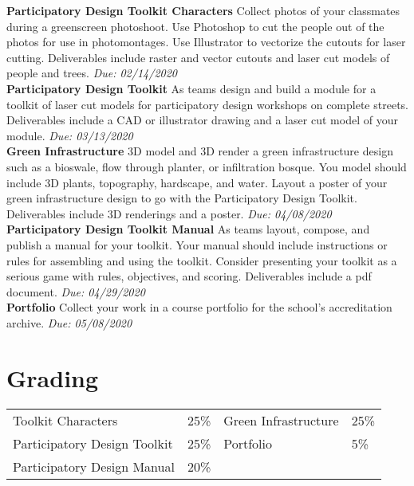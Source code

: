 \documentclass[11pt,article,oneside]{memoir}
\begin{document}
\noindent \textbf{Participatory Design Toolkit Characters}
Collect photos of your classmates
during a greenscreen photoshoot. 
Use Photoshop to cut the people out of the photos 
for use in photomontages.
Use Illustrator to vectorize the cutouts 
for laser cutting.
Deliverables include raster and vector cutouts 
and laser cut models of people and trees.
\emph{Due: 02/14/2020}\\

\noindent \textbf{Participatory Design Toolkit}
As teams design and build a module for a toolkit of laser cut models
for participatory design workshops on complete streets.
Deliverables include a CAD or illustrator drawing
and a laser cut model of your module.
\emph{Due: 03/13/2020}\\

\noindent \textbf{Green Infrastructure}
3D model and 3D render a green infrastructure design
such as a bioswale, flow through planter, or infiltration bosque.
You model should include 3D plants, topography, hardscape, and water.
Layout a poster of your green infrastructure design
to go with the Participatory Design Toolkit.
Deliverables include 3D renderings and a poster.
\emph{Due: 04/08/2020}\\

\noindent \textbf{Participatory Design Toolkit Manual}
As teams layout, compose, and publish 
a manual for your toolkit. 
Your manual should include instructions or rules
for assembling and using the toolkit. 
Consider presenting your toolkit as a serious game
with rules, objectives, and scoring.
Deliverables include a pdf document.
\emph{Due: 04/29/2020}\\

\noindent \textbf{Portfolio}
Collect your work in a course portfolio
for the school's accreditation archive.
\emph{Due: 05/08/2020}\\

\section{Grading}

\begin{table}[H]
\begin{tabular}{l r @{\hskip 2cm} l @{\hskip 0.5cm} l}

Toolkit Characters & 25\% & Green Infrastructure & 25\% \\
Participatory Design Toolkit & 25\% & Portfolio & 5\% \\
Participatory Design Manual & 20\%\\
\end{tabular}
\end{table}
\end{document}
